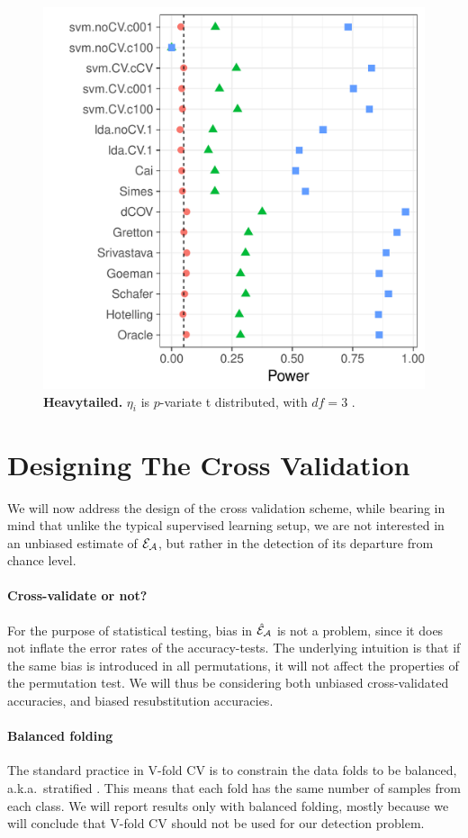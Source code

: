 \documentclass[oupdraft]{bio}
\begin{document}
\begin{figure}[th]
	\centering
	\includegraphics[width=0.5\columnwidth]{"file9"}
	\caption{\textbf{Heavytailed.} $\eta_i$ is $p$-variate t distributed, with $df=3$ .  } 
	\label{fig:t_null}
\end{figure}




\section{Designing The Cross Validation}

We will now address the design of the cross validation scheme, while bearing in mind that unlike the typical supervised learning setup, we are not interested in an unbiased estimate of $\mathcal{E}_{\mathcal{A}}$, but rather in the detection of its departure from chance level. 

\paragraph{Cross-validate or not?}
For the purpose of statistical testing, bias in $\hat{\mathcal{E}}_{\mathcal{A}}$ is not a problem, since  it does not inflate the error rates of the accuracy-tests. 
The underlying intuition is that if the same bias is introduced in all permutations, it will not affect the properties of the permutation test. 
We will thus be considering both unbiased cross-validated accuracies, and biased resubstitution accuracies.


\paragraph{Balanced folding}
The standard practice in V-fold CV is to constrain the data folds to be balanced, a.k.a.\ stratified \cite[for example]{ojala_permutation_2010}.
This means that each fold has the same number of samples from each class. 
We will report results only with balanced folding, mostly because we will conclude that V-fold CV should not be used for our detection problem. 
\end{document}

